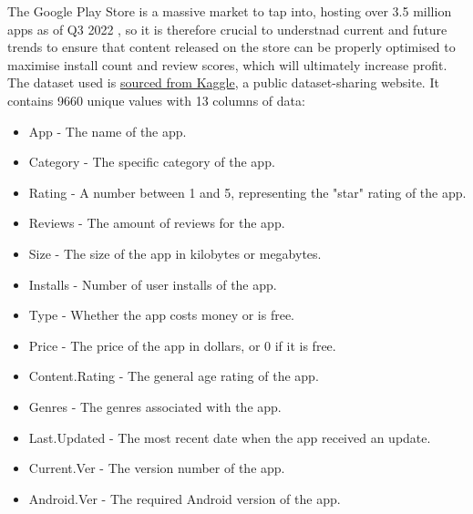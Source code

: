 \documentclass[12pt]{report}\usepackage[]{graphicx}\usepackage[]{xcolor}
\begin{document}
The Google Play Store is a massive market to tap into, hosting over 3.5 million apps as of Q3 2022 
\autocite{PlayStoreAppCount}, so it is therefore crucial to understnad current and future trends
to ensure that content released on the store can be properly optimised to maximise install count and 
review scores, which will ultimately increase profit.\\

\noindent The dataset used is \href{https://www.kaggle.com/datasets/lava18/google-play-store-apps/data}{sourced from Kaggle}, a 
public dataset-sharing website. It contains 9660 unique values with 13 columns of data:

\begin{itemize}
    \item App - The name of the app.
    \item Category - The specific category of the app.
    \item Rating - A number between 1 and 5, representing the "star" rating of the app.
    \item Reviews - The amount of reviews for the app.
    \item Size - The size of the app in kilobytes or megabytes.
    \item Installs - Number of user installs of the app.
    \item Type - Whether the app costs money or is free.
    \item Price - The price of the app in dollars, or 0 if it is free.
    \item Content.Rating - The general age rating of the app.
    \item Genres - The genres associated with the app.
    \item Last.Updated - The most recent date when the app received an update.
    \item Current.Ver - The version number of the app.
    \item Android.Ver - The required Android version of the app.
\end{itemize}
\pagebreak
\end{document}
